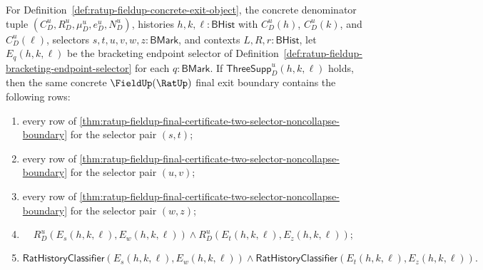 \begin{theorem}
\label{thm:ratup-fieldup-selector-chain-final-boundary}
For Definition~\ref{def:ratup-fieldup-concrete-exit-object}, the concrete
denominator tuple $(C_D^u,R_D^u,\mu_D^u,e_D^u,N_D^u)$, histories
$h,k,\ell:\mathsf{BHist}$ with $C_D^u(h)$, $C_D^u(k)$, and $C_D^u(\ell)$,
selectors $s,t,u,v,w,z:\mathsf{BMark}$, and contexts
$L,R,r:\mathsf{BHist}$, let $E_q(h,k,\ell)$ be the bracketing endpoint
selector of Definition~\ref{def:ratup-fieldup-bracketing-endpoint-selector}
for each $q:\mathsf{BMark}$. If $\mathsf{ThreeSupp}_D^u(h,k,\ell)$ holds,
then the same concrete $\FieldUp(\RatUp)$ final exit boundary contains the
following rows:
\begin{enumerate}
  \item every row of
  \autoref{thm:ratup-fieldup-final-certificate-two-selector-noncollapse-boundary}
  for the selector pair $(s,t)$;
  \item every row of
  \autoref{thm:ratup-fieldup-final-certificate-two-selector-noncollapse-boundary}
  for the selector pair $(u,v)$;
  \item every row of
  \autoref{thm:ratup-fieldup-final-certificate-two-selector-noncollapse-boundary}
  for the selector pair $(w,z)$;
  \item
  $$
  R_D^u(E_s(h,k,\ell),E_w(h,k,\ell))
  \land
  R_D^u(E_t(h,k,\ell),E_z(h,k,\ell));
  $$
  \item
  $$
  \mathsf{RatHistoryClassifier}(E_s(h,k,\ell),E_w(h,k,\ell))
  \land
  \mathsf{RatHistoryClassifier}(E_t(h,k,\ell),E_z(h,k,\ell)).
  $$
\end{enumerate}
\end{theorem}
